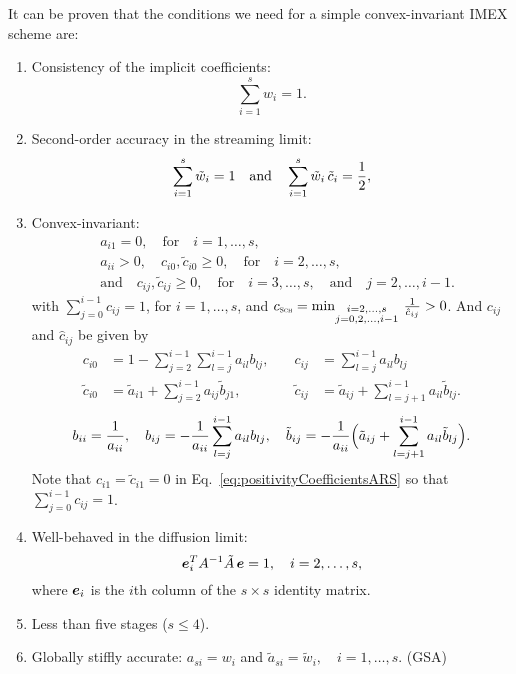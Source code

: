 It can be proven that the conditions we need for a simple convex-invariant IMEX scheme are: \cite{chu_etal_2018}
\begin{enumerate}
    \item Consistency of the implicit coefficients:
    \begin{equation}
      \sum_{i=1}^{s}w_{i}=1.
    \end{equation}
    \item Second-order accuracy in the streaming limit:
    \begin{equation}
      \sum_{i=1}^{s}\tilde{w}_{i}=1
      \quad\text{and}\quad
      \sum_{i=1}^{s}\tilde{w}_{i}\,\tilde{c}_{i}=\frac{1}{2},
      \label{eq:orderConditionsEx}
    \end{equation}
    \item Convex-invariant:
    \begin{align}
      &a_{i1} = 0, \quad \text{for} \quad i=1,\ldots,s, \nonumber \\
      &a_{ii}>0, \quad c_{i0},\tilde{c}_{i0}\ge0, \quad \text{for} \quad i=2,\ldots,s, \nonumber \\
      &\text{and} \quad c_{ij},\tilde{c}_{ij}\ge0, \quad \text{for} \quad i=3,\ldots,s, \quad\text{and}\quad j=2,\ldots,i-1.  
    \end{align}
    with $\sum_{j=0}^{i-1}c_{ij}=1$, for $i=1,\ldots,s$, and $c_{\textnormal{\tiny\textsc{Sch}}}=\min_{\substack{i = 2,\ldots,s \\ 
                  j = 0,2,\ldots,i-1}}\,\frac{1}{\hat{c}_{ij}}>0$.
    And $c_{ij}$ and $\hat{c}_{ij}$ be given by
    \begin{equation}
     \begin{aligned}
      c_{i0} &= 1-\sum_{j=2}^{i-1}\sum_{l=j}^{i-1}a_{il}b_{lj}, \quad &
      c_{ij} &= \sum_{l=j}^{i-1}a_{il}b_{lj} \\
      \tilde{c}_{i0} &= \tilde{a}_{i1}+\sum_{j=2}^{i-1}a_{ij}\tilde{b}_{j1}, \quad &
      \tilde{c}_{ij} &= \tilde{a}_{ij}+\sum_{l=j+1}^{i-1}a_{il}\tilde{b}_{lj}.  
     \end{aligned}
     \label{eq:positivityCoefficientsARS}
    \end{equation}
    \begin{equation}
      b_{ii} = \frac{1}{a_{ii}}, \quad
      b_{ij} = -\frac{1}{a_{ii}}\sum_{l=j}^{i-1}a_{il}b_{lj}, \quad
      \tilde{b}_{ij} = -\frac{1}{a_{ii}}\Big(\tilde{a}_{ij}+\sum_{l=j+1}^{i-1}a_{il}\tilde{b}_{lj}\Big).  
    \end{equation}
    Note that $c_{i1}=\tilde{c}_{i1}=0$ in Eq.~\eqref{eq:positivityCoefficientsARS} so that $\sum_{j=0}^{i-1}c_{ij}=1$.
    \item Well-behaved in the diffusion limit:
    \begin{equation}
      \boldsymbol{e}_{i}^{T}A^{-1}\tilde{A}\,\boldsymbol{e} = 1, \quad i=2,\ldots,s,
      \label{eq:diffusionCondition}
    \end{equation}
    where $\boldsymbol{e}_{i}$ is the $i$th column of the $s\times s$ identity matrix.
    \item Less than five stages ($s\le4$).
    \item Globally stiffly accurate: $a_{si}=w_{i}$ and $\tilde{a}_{si}=\tilde{w}_{i},\quad i=1,\ldots,s$. (GSA)
\end{enumerate}  

